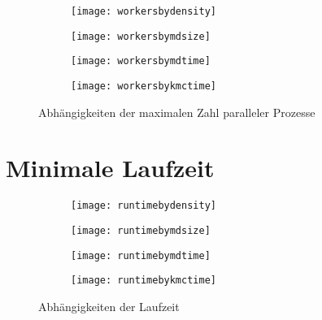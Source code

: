 
\begin{figure}[!hp]

  \captionsetup[subfigure]{singlelinecheck=false}
  \def\subfigwidth{7cm}
  \begin{subfigure}[t]{\subfigwidth}
    \texttt{[image: workersbydensity]}
  \end{subfigure}
  \hfill
  \begin{subfigure}[t]{\subfigwidth}
    \texttt{[image: workersbymdsize]}
  \end{subfigure}

  \begin{subfigure}[t]{\subfigwidth}
    \texttt{[image: workersbymdtime]}
  \end{subfigure}
  \hfill
  \begin{subfigure}[t]{\subfigwidth}
    \texttt{[image: workersbykmctime]}
  \end{subfigure}
  \hfill

  \caption{Abhängigkeiten der maximalen Zahl paralleler Prozesse}

\end{figure}


\section{Minimale Laufzeit}


\begin{figure}[!hp]

  \captionsetup[subfigure]{singlelinecheck=false}
  \def\subfigwidth{7cm}
  \begin{subfigure}[t]{\subfigwidth}
    \texttt{[image: runtimebydensity]}
  \end{subfigure}
  \hfill
  \begin{subfigure}[t]{\subfigwidth}
    \texttt{[image: runtimebymdsize]}
  \end{subfigure}

  \begin{subfigure}[t]{\subfigwidth}
    \texttt{[image: runtimebymdtime]}
  \end{subfigure}
  \hfill
  \begin{subfigure}[t]{\subfigwidth}
    \texttt{[image: runtimebykmctime]}
  \end{subfigure}
  \hfill

  \caption{Abhängigkeiten der Laufzeit}

\end{figure}

